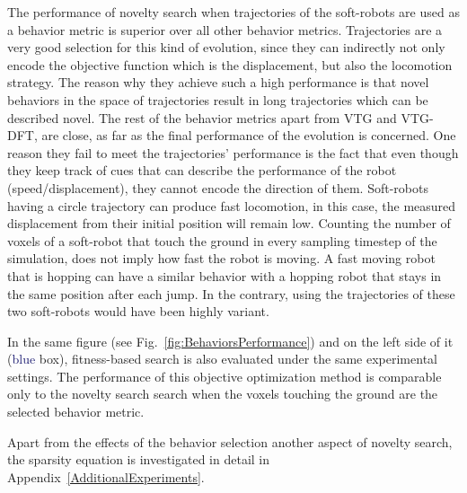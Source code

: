 The performance of novelty search when trajectories of the soft-robots are used as a behavior metric is superior over all other behavior metrics. Trajectories are a very good selection for this kind of evolution, since they can indirectly not only encode the objective function which is the displacement, but also the locomotion strategy. The reason why they achieve such a high performance is that novel behaviors in the space of trajectories result in long trajectories which can be described novel. The rest of the behavior metrics apart from VTG and VTG-DFT, are close, as far as the final performance of the evolution is concerned. One reason they fail to meet the trajectories' performance is the fact that even though they keep track of cues that can describe the performance of the robot (speed/displacement), they cannot encode the direction of them. Soft-robots having a circle trajectory can produce fast locomotion, in this case, the measured displacement from their initial position will remain low. Counting the number of voxels of a soft-robot that touch the ground in every sampling timestep of the simulation, does not imply how fast the robot is moving. A fast moving robot that is hopping can have a similar behavior with a hopping robot that stays in the same position after each jump. In the contrary, using the trajectories of these two soft-robots would have been highly variant. 

In the same figure (see Fig.~\ref{fig:BehaviorsPerformance}) and on the left side of it (\textcolor{MidnightBlue}{blue} box), fitness-based search is also evaluated under the same experimental settings. The performance of this objective optimization method is comparable only to the novelty search search when the voxels touching the ground are the selected behavior metric.

Apart from the effects of the behavior selection another aspect of novelty search, the sparsity equation is investigated in detail in Appendix~\ref{AdditionalExperiments}.




